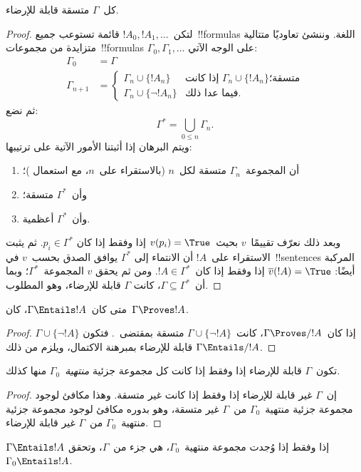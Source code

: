 \documentclass[../../../include/open-logic-section]{subfiles}
\begin{document}
\begin{thm}[الاكتمال]
كل~$\Gamma$ متسقة قابلة للإرضاء.
\end{thm}

\begin{proof}
لتكن~$!A_0,!A_1,\dots$ قائمة تستوعب جميع~!!{formula}s اللغة. وننشئ
تعاوديًا متتالية متزايدة من مجموعات~!!{formula}s
$\Gamma_0,\Gamma_1,\dots$ على الوجه الآتي:
\begin{align*}
\Gamma_0 & = \Gamma\\
\Gamma_{n+1} &  =
\begin{cases}
  \Gamma_n \cup \{!A_n\} & \text{إذا كانت $\Gamma_n\cup\{!A_n\}$
    متسقة؛}\\
  \Gamma_n \cup \{\lnot !A_n\} & \text{فيما عدا ذلك.}
\end{cases}
\end{align*}
ثم نضع:
\[
\Gamma^*=\bigcup_{0\le n}\Gamma_n.
\]
ويتم البرهان إذا أثبتنا الأمور الآتية على ترتيبها:
\begin{enumerate}
\item أن المجموعة~$\Gamma_n$ متسقة لكل~$n$ (بالاستقراء على~$n$، مع استعمال
  )؛
\item وأن~$\Gamma^*$ متسقة؛
\item وأن~$\Gamma^*$ أعظمية.
\end{enumerate}
وبعد ذلك نعرّف تقييمًا~$v$ بحيث~$v(p_i)=\True$ إذا وفقط إذا كان
$p_i\in\Gamma^*$. ثم يثبت الاستقراء على~$!A$ أن الانتماء إلى
$\Gamma^*$ يوافق الصدق بحسب~$v$ في~!!{sentence}s المركبة أيضًا:
$\overline{v}(!A)=\True$ إذا وفقط إذا كان~$!A\in\Gamma^*$. ومن ثم يحقق
$v$ المجموعة~$\Gamma^*$؛ وبما أن~$\Gamma\subseteq\Gamma^*$، كانت
$\Gamma$ قابلة للإرضاء، وهو المطلوب.
\end{proof}

\begin{cor}
متى كان~$\Gamma\Entails !A$، كان~$\Gamma\Proves !A$.
\end{cor}

\begin{proof}
إذا كان~$\Gamma\Proves/ !A$، كانت~$\Gamma\cup\{\lnot !A\}$ متسقة
بمقتضى~. فتكون
$\Gamma\cup\{\lnot !A\}$ قابلة للإرضاء بمبرهنة الاكتمال، ويلزم من ذلك
$\Gamma\Entails/ !A$.
\end{proof}

\begin{prop}
تكون~$\Gamma$ قابلة للإرضاء إذا وفقط إذا كانت كل مجموعة جزئية
\emph{منتهية}~$\Gamma_0$ منها كذلك.
\end{prop}

\begin{proof}
إن~$\Gamma$ غير قابلة للإرضاء إذا وفقط إذا كانت غير متسقة. وهذا مكافئ
لوجود مجموعة جزئية منتهية~$\Gamma_0$ من~$\Gamma$ غير متسقة، وهو بدوره
مكافئ لوجود مجموعة جزئية منتهية~$\Gamma_0$ من~$\Gamma$ غير قابلة للإرضاء.
\end{proof}

\begin{cor}
$\Gamma\Entails !A$ إذا وفقط إذا وُجدت مجموعة منتهية~$\Gamma_0$، هي جزء
من~$\Gamma$، وتحقق~$\Gamma_0\Entails !A$.
\end{cor}
\end{document}
